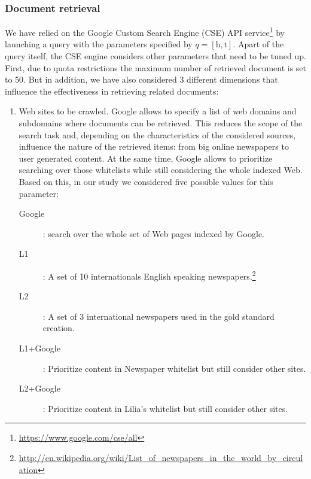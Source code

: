 \documentclass{llncs}
\begin{document}
\subsubsection{Document retrieval}
We have relied on the Google Custom Search Engine (CSE) API service\footnote{\fontsize{8pt}{1em}\selectfont  \url{https://www.google.com/cse/all}} by launching a query with the parameters specified by $q= \left [ \text{h}, \text{t} \right ]$. Apart of the query itself, the CSE engine considers other parameters that need to be tuned up. First, due to quota restrictions the maximum number of retrieved document is set to 50. But in addition, we have also considered 3 different dimensions that influence the effectiveness in retrieving related documents:
\begin{enumerate}
 \item Web sites to be crawled. Google allows to specify a list of web domains and subdomains where documents can be retrieved. This reduces the scope of the search task and, depending on the characteristics of the considered sources, influence the nature of the retrieved items: from big online newspapers to user generated content. At the same time, Google allows to prioritize searching over those whitelists while still considering the  whole indexed Web. Based on this, in our study we considered five possible values for this parameter:
 \begin{description}
  \item[Google]: search over the whole set of Web pages indexed by Google.
  \item[L1]: A set of 10 internationals English speaking newspapers.\footnote{\fontsize{8pt}{1em}\selectfont  \url{http://en.wikipedia.org/wiki/List_of_newspapers_in_the_world_by_circulation}}
  \item[L2]: A set of 3 international newspapers used in the gold standard creation.
  \item[L1+Google]: Prioritize content in Newspaper whitelist but still consider other sites.
  \item[L2+Google]: Prioritize content in Lilia's whitelist but still consider other sites.
 \end{description}

\end{enumerate}
\end{document}
